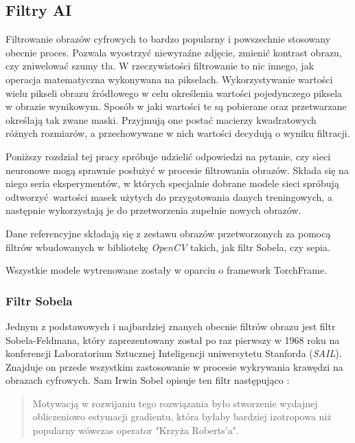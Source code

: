 \subsection{Filtry AI}

  Filtrowanie obrazów cyfrowych to bardzo popularny i powszechnie stosowany
  obecnie proces. Pozwala wyostrzyć niewyraźne zdjęcie, zmienić kontrast obrazu,
  czy zniwelować szumy tła. W rzeczywistości filtrowanie to nic innego, jak
  operacja matematyczna wykonywana na pikselach. Wykorzystywanie wartości wielu
  pikseli obrazu źródłowego w celu określenia wartości pojedynczego piksela w
  obrazie wynikowym. Sposób w jaki wartości te są pobierane oraz przetwarzane
  określają tak zwane maski. Przyjmują one postać macierzy kwadratowych różnych
  rozmiarów, a przechowywane w nich wartości decydują o wyniku filtracji.

  Poniższy rozdział tej pracy spróbuje udzielić odpowiedzi na pytanie, czy
  sieci neuronowe mogą sprawnie posłużyć w procesie filtrowania obrazów.
  Składa się na niego seria eksperymentów, w których specjalnie dobrane modele
  sieci spróbują odtworzyć wartości masek użytych do przygotowania danych
  treningowych, a następnie wykorzystają je do przetworzenia zupełnie nowych
  obrazów.

  Dane referencyjne składają się z zestawu obrazów przetworzonych za pomocą
  filtrów wbudowanych w bibliotekę \textit{OpenCV} takich, jak filtr Sobela, czy
  sepia.

  Wszystkie modele wytrenowane zostały w oparciu o framework TorchFrame.

  \subsubsection{Filtr Sobela}

    Jednym z podstawowych i najbardziej znanych obecnie filtrów obrazu jest
    filtr Sobela-Feldmana, który zaprezentowany został po raz pierwszy w 1968
    roku na konferencji Laboratorium Sztucznej Inteligencji uniwersytetu Stanforda
    (\textit{SAIL}). Znajduje on przede wszystkim zastosowanie w procesie wykrywania krawędzi
    na obrazach cyfrowych. Sam Irwin Sobel opisuje ten filtr następująco \cite{sobel}:

    \begin{quote}
      Motywacją w rozwijaniu tego rozwiązania było stworzenie wydajnej obliczeniowo
      estymacji gradientu, która byłaby bardziej izotropowa niż popularny wówczas operator
      "Krzyża Roberts'a".
    \end{quote}

